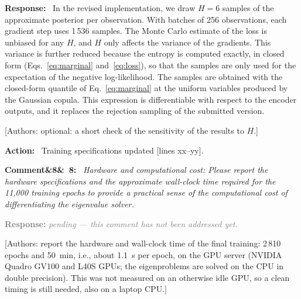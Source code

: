 \documentclass[11pt]{article}
\newenvironment{rcomment}[1]{\par\bigskip\noindent\textbf{Comment\ifx&#1&\else\ #1\fi:}\ \itshape}{\par}
\newenvironment{response}{\par\smallskip\noindent\color{resp}\textbf{Response:}\ }{\par}
\newenvironment{action}{\par\smallskip\noindent\color{resp}\textbf{Action:}\ }{\par}
\newcommand{\pending}{\par\smallskip\noindent\textcolor{gray}{\textbf{Response:} \textit{pending --- this comment
has not been addressed yet.}}\par}
\newcommand{\authornote}[1]{\textcolor{note}{\textsf{[Authors: #1]}}}
\newcommand{\tbd}[1]{\textcolor{note}{\textsf{[#1]}}}
\newcommand{\lines}[1]{\tbd{lines #1}}
\begin{document}
\begin{response}
In the revised implementation, we draw $H=6$ samples of the approximate posterior per observation. With batches of 256
observations, each gradient step uses 1\,536 samples. The Monte Carlo estimate of the loss is unbiased for any $H$, and
$H$ only affects the variance of the gradients. This variance is further reduced because the entropy is computed
exactly, in closed form (Eqs.~\eqref{eq:marginal} and~\eqref{eq:loss}), so that the samples are only used for the
expectation of the negative log-likelihood. The samples are obtained with the closed-form quantile of
Eq.~\eqref{eq:marginal} at the uniform variables produced by the Gaussian copula. This expression is differentiable with
respect to the encoder outputs, and it replaces the rejection sampling of the submitted version.
\end{response}
\authornote{optional: a short check of the sensitivity of the results to $H$.}

\begin{action}
Training specifications updated \lines{xx--yy}.
\end{action}

\begin{rcomment}{8}
Hardware and computational cost: Please report the hardware specifications and the approximate wall-clock time
required for the 11,000 training epochs to provide a practical sense of the computational cost of differentiating the
eigenvalue solver.
\end{rcomment}
\pending
\authornote{report the hardware and wall-clock time of the final training: 2\,810 epochs and 50~min, i.e., about 1.1~s per
epoch, on the GPU server (NVIDIA Quadro GV100 and L40S GPUs; the eigenproblems are solved on the CPU in double
precision). This was not measured on an otherwise idle GPU, so a clean timing is still needed, also on a laptop CPU.}
\end{document}

